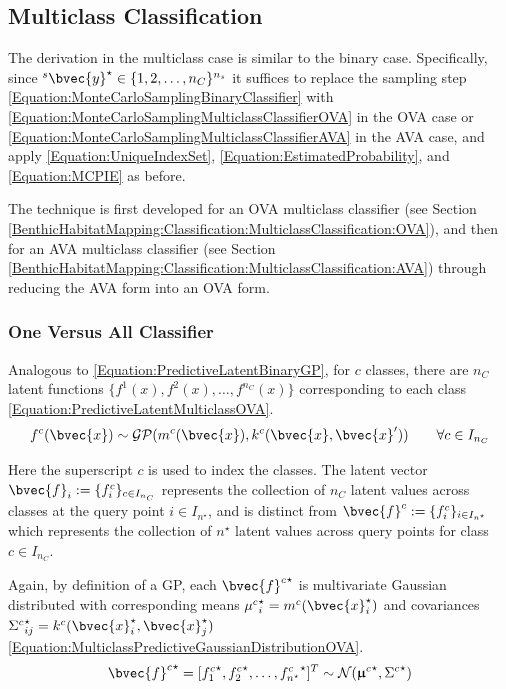 		\subsection{Multiclass Classification}
		\label{InformativeSeafloorExploration:MCPIE:Multiclass}
		
			The derivation in the multiclass case is similar to the binary case. Specifically, since ${^{s}}\bvec{y}^{\star} \in \{1, 2, \dots, n_{C}\}^{n_{s}}$ it suffices to replace the sampling step \eqref{Equation:MonteCarloSamplingBinaryClassifier} with \eqref{Equation:MonteCarloSamplingMulticlassClassifierOVA} in the OVA case or \eqref{Equation:MonteCarloSamplingMulticlassClassifierAVA} in the AVA case, and apply \eqref{Equation:UniqueIndexSet}, \eqref{Equation:EstimatedProbability}, and \eqref{Equation:MCPIE} as before.
			
			The technique is first developed for an OVA multiclass classifier (see Section \ref{BenthicHabitatMapping:Classification:MulticlassClassification:OVA}), and then for an AVA multiclass classifier (see Section \ref{BenthicHabitatMapping:Classification:MulticlassClassification:AVA}) through reducing the AVA form into an OVA form. 
			
			\subsubsection{One Versus All Classifier}
			\label{InformativeSeafloorExploration:MCPIE:Multiclass:OVA}
			
				Analogous to \eqref{Equation:PredictiveLatentBinaryGP}, for $c$ classes, there are $n_{C}$ latent functions $\{f^{1}(x), f^{2}(x), \dots, f^{n_{C}}(x)\}$ corresponding to each class \eqref{Equation:PredictiveLatentMulticlassOVA}. \begin{equation}
					f^{c}(\bvec{x}) \sim \mathcal{GP}(m^{c}(\bvec{x}), k^{c}(\bvec{x}, \bvec{x}')) \qquad \forall c \in I_{n_{C}}
				\label{Equation:PredictiveLatentMulticlassOVA}
				\end{equation}
							
				Here the superscript $c$ is used to index the classes. The latent vector $\bvec{f}_{i} := \{f^{c}_{i}\}_{c \in I_{n_{C}}}$ represents the collection of $n_{C}$ latent values across classes at the query point $i \in I_{n^{\star}}$, and is distinct from $\bvec{f}^{c} := \{f^{c}_{i}\}_{i \in I_{n^{\star}}}$ which represents the collection of $n^{\star}$ latent values across query points for class $c \in I_{n_{C}}$.
				
				Again, by definition of a GP, each ${\bvec{f}^{c}}^{\star}$ is multivariate Gaussian distributed with corresponding means ${\mu^{c}}^{\star}_{i} = m^{c}(\bvec{x}^{\star}_{i})$ and covariances ${\Sigma^{c}}^{\star}_{ij} = k^{c}(\bvec{x}^{\star}_{i}, \bvec{x}^{\star}_{j})$ \eqref{Equation:MulticlassPredictiveGaussianDistributionOVA}. \begin{equation}
					{\bvec{f}^{c}}^{\star} = [{f^{c}_{1}}^{\star}, {f^{c}_{2}}^{\star}, \dots, {f^{c}_{n^{\star}}}^{\star}]^{T} \sim \mathcal{N}({\vec{\upmu}^{c}}^{\star}, {\Sigma^{c}}^{\star})
				\label{Equation:MulticlassPredictiveGaussianDistributionOVA}
				\end{equation}
				
